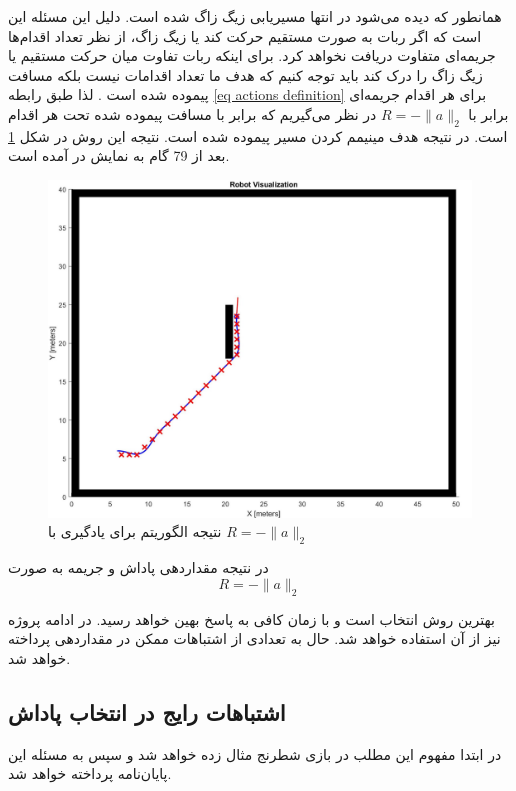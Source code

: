 همانطور که دیده می‌شود در انتها مسیریابی زیگ زاگ شده است. دلیل این مسئله این است که اگر ربات به صورت مستقیم حرکت کند یا زیگ زاگ، از نظر تعداد اقدام‌ها جریمه‌ای متفاوت دریافت نخواهد کرد. برای اینکه ربات تفاوت میان حرکت مستقیم یا زیگ زاگ را درک کند باید توجه کنیم که هدف ما تعداد اقدامات نیست بلکه مسافت پیموده شده است . لذا طبق رابطه \ref{eq actions definition} برای هر اقدام جریمه‌ای برابر با $R=-\|a\|_2$ در نظر می‌گیریم که برابر با مسافت پیموده شده تحت هر اقدام است. در نتیجه هدف مینیمم کردن مسیر پیموده شده است. نتیجه این روش در شکل \ref{Fig QL R=-normA} بعد از 79 گام به نمایش در آمده است.
\begin{figure}[!h]
	\centering
	\includegraphics[scale=0.3]{Images/QL path R=-normA.jpg}
	\caption{نتیجه الگوریتم  برای یادگیری با $R=-\|a\|_2$}\label{Fig QL R=-normA}
\end{figure}

در نتیجه مقداردهی پاداش و جریمه به صورت 
\begin{equation}\label{eq R optimal}
	R=-\|a\|_2
\end{equation}

بهترین روش انتخاب است و با زمان کافی به پاسخ بهین خواهد رسید. در ادامه پروژه نیز از آن استفاده خواهد شد. حال به تعدادی از اشتباهات ممکن در مقداردهی  پرداخته خواهد شد.

\subsection{اشتباهات رایج در انتخاب پاداش}
در ابتدا مفهوم این مطلب در بازی شطرنج مثال زده خواهد شد و سپس به مسئله این پایان‌نامه پرداخته خواهد شد.

